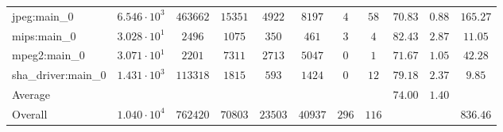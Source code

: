 \begin{tabular}{|l|c|c|c|c|c|c|c|c|c|c|}
jpeg:main\_0            & $ 6.546 \cdot 10^{3} $ & $ 463662 $ & $ 15351 $ & $ 4922  $ & $ 8197  $ & $ 4   $ & $ 58  $ & $ 70.83       $ & $ 0.88    $ & $ 165.27  $ \\
mips:main\_0            & $ 3.028 \cdot 10^{1} $ & $ 2496   $ & $ 1075  $ & $ 350   $ & $ 461   $ & $ 3   $ & $ 4   $ & $ 82.43       $ & $ 2.87    $ & $ 11.05   $ \\
mpeg2:main\_0           & $ 3.071 \cdot 10^{1} $ & $ 2201   $ & $ 7311  $ & $ 2713  $ & $ 5047  $ & $ 0   $ & $ 1   $ & $ 71.67       $ & $ 1.05    $ & $ 42.28   $ \\
sha\_driver:main\_0     & $ 1.431 \cdot 10^{3} $ & $ 113318 $ & $ 1815  $ & $ 593   $ & $ 1424  $ & $ 0   $ & $ 12  $ & $ 79.18       $ & $ 2.37    $ & $ 9.85    $ \\
\hline
Average                 & $                    $ & $        $ & $       $ & $       $ & $       $ & $     $ & $     $ & $ 74.00       $ & $ 1.40    $ & $         $ \\
\hline
Overall                 & $ 1.040 \cdot 10^{4} $ & $ 762420 $ & $ 70803 $ & $ 23503 $ & $ 40937 $ & $ 296 $ & $ 116 $ & $             $ & $         $ & $ 836.46  $ \\
\hline
\end{tabular}
